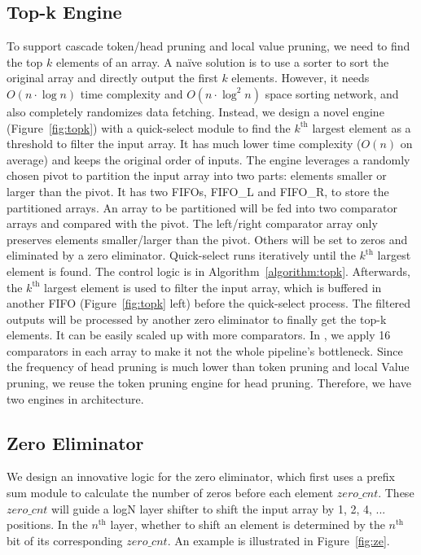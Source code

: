 \subsection{Top-k Engine}
To support cascade token/head pruning and local value pruning, we need to find the top $k$ elements of an array. A na\"ive solution is to use a sorter to sort the original array and directly output the first $k$ elements. However, it needs $O(n\cdot \log n)$ time complexity and $O(n\cdot \log^2n)$ space sorting network, and also completely randomizes data fetching.
Instead, we design a novel \topk engine (Figure~\ref{fig:topk}) with a quick-select module to find the $k^{\mathrm{th}}$ largest element as a threshold to filter the input array. It has much lower time complexity ($O(n)$ on average) and keeps the original order of inputs.
The engine leverages a randomly chosen pivot to partition the input array into two parts: elements smaller or larger than the pivot. It has two FIFOs, FIFO\_L and FIFO\_R, to store the partitioned arrays. An array to be partitioned will be fed into two comparator arrays and compared with the pivot. The left/right comparator array only preserves elements smaller/larger than the pivot. Others will be set to zeros and eliminated by a zero eliminator. Quick-select runs iteratively until the $k^{\mathrm{th}}$ largest element is found. The control logic is in Algorithm~\ref{algorithm:topk}.
Afterwards, the $k^{\mathrm{th}}$ largest element is used to filter the input array, which is buffered in another FIFO (Figure~\ref{fig:topk} left) before the quick-select process. The filtered outputs will be processed by another zero eliminator to finally get the top-k elements.
It can be easily scaled up with more comparators. In \spatten, we apply 16 comparators in each array to make it not the whole pipeline's bottleneck. Since the frequency of head pruning is much lower than token pruning and local Value pruning, we reuse the token pruning \topk engine for head pruning. Therefore, we have two \topk engines in \name architecture.


\subsection{Zero Eliminator}
We design an innovative logic for the zero eliminator, which first uses a prefix sum module to calculate the number of zeros before each element $zero\_cnt$. These $zero\_cnt$ will guide a logN layer shifter to shift the input array by 1, 2, 4, ... positions. In the $n^{\mathrm{th}}$ layer, whether to shift an element is determined by the $n^{\mathrm{th}}$ bit of its corresponding $zero\_cnt$. An example is illustrated in Figure~\ref{fig:ze}.


